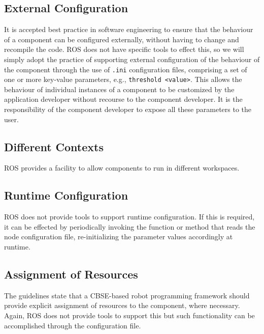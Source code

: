 \documentclass{CSSRforAfrica}
\begin{document}
\subsection{External Configuration}

It is accepted best practice in software engineering to ensure that the behaviour of a component can be configured externally, without having to change and recompile the code.  ROS does not have specific tools to effect this, so we will simply adopt the practice of supporting { external configuration} of the behaviour of the component through the use of {\small \verb+.ini+} configuration files, comprising a set of one or more key-value parameters, e.g.,  {\small \verb+threshold <value>+}. This allows the behaviour of individual instances of a component to be customized by the application developer without recourse to the component developer.  It is the responsibility of the component developer to expose all these parameters to the user.   

 
\subsection{Different Contexts}

ROS provides a facility to allow components to run in different workspaces.  
 
 
\subsection{Runtime Configuration}
\label{section:runtime}

ROS does not provide tools to support runtime configuration. If this is required, it can be effected by periodically invoking the function or method that reads the node configuration file,  re-initializing the parameter values accordingly at runtime.

\subsection{Assignment of Resources}

The guidelines state that a CBSE-based robot programming framework should provide explicit {assignment of resources} to the component, where necessary.  
Again,  ROS does not provide tools to support this but such functionality can be accomplished through the configuration file. 
\end{document}
